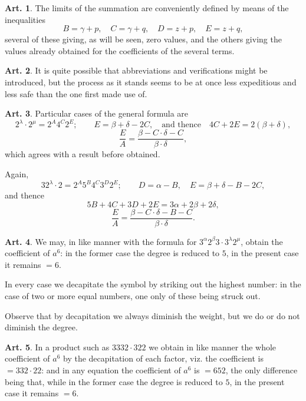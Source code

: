\documentclass[11pt,a4paper]{article}
\theoremstyle{definition}
\newtheorem{art}{Art.}[section]
\begin{document}
\begin{art}
The limits of the summation are conveniently defined by means of the inequalities
\[
B = \gamma + p, \quad C = \gamma + q, \quad D = z + p, \quad E = z + q,
\]
several of these giving, as will be seen, zero values, and the others giving the values already obtained for the coefficients of the several terms.
\end{art}

\begin{art}
It is quite possible that abbreviations and verifications might be introduced, but the process as it stands seems to be at once less expeditious and less safe than the one first made use of.
\end{art}

\begin{art}
Particular cases of the general formula are
\[
2^\lambda \cdot 2^\mu = 2^A 4^C 2^E; \qquad E = \beta + \delta - 2C, \quad \text{and thence} \quad 4C + 2E = 2(\beta + \delta),
\]
\[
\frac{E}{A} = \frac{\beta - C \cdot \delta - C}{\beta \cdot \delta},
\]
which agrees with a result before obtained.

Again,
\[
32^\lambda \cdot 2 = 2^A 5^B 4^C 3^D 2^E; \qquad D = \alpha - B, \quad E = \beta + \delta - B - 2C,
\]
and thence
\[
5B + 4C + 3D + 2E = 3\alpha + 2\beta + 2\delta,
\]
\[
\frac{E}{A} = \frac{\beta - C \cdot \delta - B - C}{\beta \cdot \delta}.
\]
\end{art}

\begin{art}
We may, in like manner with the formula for $3^\alpha 2^\beta 3 \cdot 3^\lambda 2^\mu$, obtain the coefficient of $a^6$: in the former case the degree is reduced to $5$, in the present case it remains $= 6$.

In every case we decapitate the symbol by striking out the highest number: in the case of two or more equal numbers, one only of these being struck out.

Observe that by decapitation we always diminish the weight, but we do or do not diminish the degree.
\end{art}

\begin{art}
In a product such as $3332 \cdot 322$ we obtain in like manner the whole coefficient of $a^6$ by the decapitation of each factor, viz. the coefficient is $= 332 \cdot 22$: and in any equation the coefficient of $a^6$ is $= 652$, the only difference being that, while in the former case the degree is reduced to $5$, in the present case it remains $= 6$.
\end{art}
\end{document}
